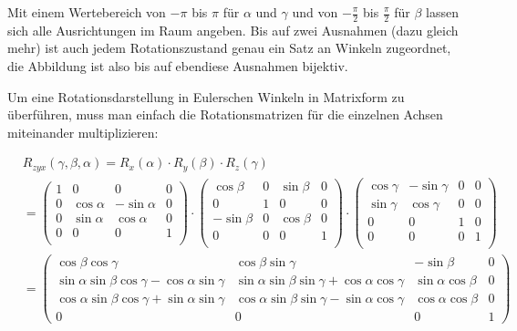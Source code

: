Mit einem Wertebereich von $-\pi$ bis $\pi$ für $\alpha$ und $\gamma$ und von $-\frac{\pi}{2}$ bis $\frac{\pi}{2}$ für $\beta$ lassen sich alle Ausrichtungen im Raum angeben. Bis auf zwei Ausnahmen (dazu gleich mehr) ist auch jedem Rotationszustand genau ein Satz an Winkeln zugeordnet, die Abbildung ist also bis auf ebendiese Ausnahmen bijektiv.

Um eine Rotationsdarstellung in Eulerschen Winkeln in Matrixform zu überführen, muss man einfach die Rotationsmatrizen für die einzelnen Achsen miteinander multiplizieren:

\begin{equation}
\begin{split}
 &R_{zyx}( \gamma, \beta, \alpha ) = R_x( \alpha ) \cdot R_y( \beta ) \cdot R_z( \gamma ) \\
 &=
 \begin{pmatrix}
  1 & 0 & 0 & 0 \\
  0 & \cos \alpha & -\sin \alpha & 0 \\
  0 & \sin \alpha &  \cos \alpha & 0 \\
  0 & 0 & 0 & 1 \\
 \end{pmatrix} \cdot
 \begin{pmatrix}
  \cos \beta & 0 & \sin \beta & 0 \\
  0 & 1 & 0 & 0 \\
  -\sin \beta & 0 & \cos \beta & 0 \\
  0 & 0 & 0 & 1 \\
 \end{pmatrix} \cdot
 \begin{pmatrix}
  \cos \gamma & -\sin \gamma & 0 & 0 \\
  \sin \gamma &  \cos \gamma & 0 & 0 \\
  0 & 0 & 1 & 0 \\
  0 & 0 & 0 & 1 \\
 \end{pmatrix} \\
 &=
 \begin{pmatrix}
  \cos \beta \cos \gamma & \cos \beta \sin \gamma & - \sin \beta & 0 \\
  \sin \alpha \sin \beta \cos \gamma - \cos \alpha \sin \gamma & \sin \alpha \sin \beta \sin \gamma + \cos \alpha \cos \gamma & \sin \alpha \cos \beta & 0\\
  \cos \alpha \sin \beta \cos \gamma + \sin \alpha \sin \gamma & \cos \alpha \sin \beta \sin \gamma - \sin \alpha \cos \gamma & \cos \alpha \cos \beta & 0\\
  0 & 0 & 0 & 1
 \end{pmatrix}
\end{split}
\end{equation}

